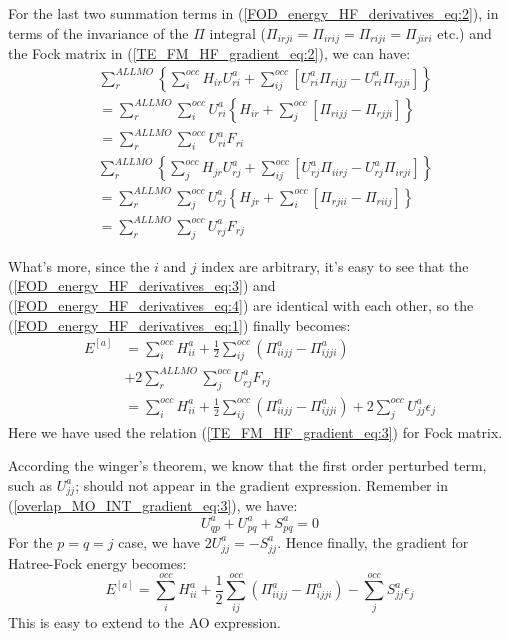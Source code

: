 For the last two summation terms in (\ref{FOD_energy_HF_derivatives_eq:2}), in
terms of the invariance of the $\Pi$ integral ($\Pi_{irji} = \Pi_{irij} =
\Pi_{riji} = \Pi_{jiri}$ etc.) and the Fock matrix in
(\ref{TE_FM_HF_gradient_eq:2}), we can have:
\begin{align}
\label{FOD_energy_HF_derivatives_eq:3}
 &\sum_{r}^{ALL MO}\left\lbrace  \sum_{i}^{occ}H_{ir}U^{a}_{ri} +
\sum_{ij}^{occ}\left[ U^{a}_{ri}\Pi_{rijj} - U^{a}_{ri}\Pi_{rjji}\right] 
\right\rbrace \nonumber \\
&= \sum_{r}^{ALL MO}\sum_{i}^{occ}U^{a}_{ri}\left\lbrace H_{ir} + 
\sum_{j}^{occ} \left[ \Pi_{rijj} - \Pi_{rjji}\right]  \right\rbrace \nonumber \\
&= \sum_{r}^{ALL MO}\sum_{i}^{occ}U^{a}_{ri}F_{ri} 
\end{align}
\begin{align}
 \label{FOD_energy_HF_derivatives_eq:4}
&\sum_{r}^{ALL MO}\left\lbrace  \sum_{j}^{occ}H_{jr}U^{a}_{rj} +
\sum_{ij}^{occ}\left[ U^{a}_{rj}\Pi_{iirj} - U^{a}_{rj}\Pi_{irji}\right] 
\right\rbrace \nonumber \\
&= \sum_{r}^{ALL MO}\sum_{j}^{occ}U^{a}_{rj}\left\lbrace H_{jr} +
\sum_{i}^{occ}\left[\Pi_{rjii} - \Pi_{riij}\right] 
\right\rbrace \nonumber \\ 
&= \sum_{r}^{ALL MO}\sum_{j}^{occ}U^{a}_{rj}F_{rj}
\end{align}

What's more, since the $i$ and $j$ index are arbitrary, it's easy to see that
the (\ref{FOD_energy_HF_derivatives_eq:3}) and
(\ref{FOD_energy_HF_derivatives_eq:4}) are identical with each other, so the
(\ref{FOD_energy_HF_derivatives_eq:1}) finally becomes:
\begin{align}
 \label{FOD_energy_HF_derivatives_eq:5}
E^{[a]} &= \sum_{i}^{occ}H^{a}_{ii} + \frac{1}{2}\sum_{ij}^{occ}\left(
\Pi^{a}_{iijj} -
\Pi^{a}_{ijji}\right) \nonumber \\
&+ 2\sum_{r}^{ALL MO}\sum_{j}^{occ}U^{a}_{rj}F_{rj} \nonumber \\
&= \sum_{i}^{occ}H^{a}_{ii} + \frac{1}{2}\sum_{ij}^{occ}\left( \Pi^{a}_{iijj} -
\Pi^{a}_{ijji}\right) + 2\sum_{j}^{occ}U^{a}_{jj}\epsilon_{j}
\end{align}
Here we have used the relation (\ref{TE_FM_HF_gradient_eq:3}) for Fock matrix.

According the winger's theorem, we know that the first order perturbed term,
such as $U^{a}_{jj}$; should not appear in the gradient expression. Remember in
(\ref{overlap_MO_INT_gradient_eq:3}), we have:
\begin{equation}
 U^{a}_{qp} + U^{a}_{pq} + S^{a}_{pq} = 0
\end{equation}
For the $p=q=j$ case, we have $2U^{a}_{jj} = -S^{a}_{jj}$. Hence finally, the
gradient for Hatree-Fock energy becomes:
\begin{equation}
 \label{FOD_energy_HF_derivatives_eq:6}
E^{[a]} = \sum_{i}^{occ}H^{a}_{ii} + \frac{1}{2}\sum_{ij}^{occ}\left(
\Pi^{a}_{iijj} -
\Pi^{a}_{ijji}\right) - \sum_{j}^{occ}S^{a}_{jj}\epsilon_{j}
\end{equation}
This is easy to extend to the AO expression.
 
